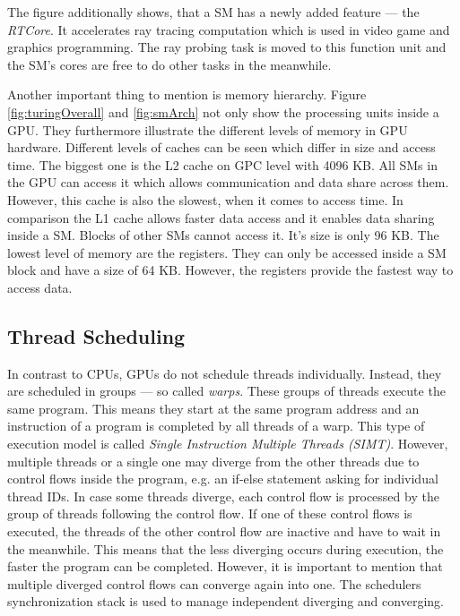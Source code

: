   The figure additionally shows, that a SM has a newly added feature --- the \textit{RTCore}.
  It accelerates ray tracing computation which is used in video game and graphics programming.
  The ray probing task is moved to this function unit and the SM's cores are free to do other tasks in the meanwhile.
  
 Another important thing to mention is memory hierarchy.
 Figure \ref{fig:turingOverall} and \ref{fig:smArch} not only show the processing units inside a GPU.
 They furthermore illustrate the different levels of memory in GPU hardware.
 Different levels of caches can be seen which differ in size and access time.
 The biggest one is the L2 cache on GPC level with 4096 KB.
 All SMs in the GPU can access it which allows communication and data share across them.
 However, this cache is also the slowest, when it comes to access time.
 In comparison the L1 cache allows faster data access and it enables data sharing inside a SM.
 Blocks of other SMs cannot access it. 
 It's size is only 96 KB.
 The lowest level of memory are the registers.
 They can only be accessed inside a SM block and have a size of 64 KB.
 However, the registers provide the fastest way to access data.~\cite{Huang.2008}~\cite{NVIDIA.2019}
        


\subsection{Thread Scheduling}
\label{subsec:Thr}
  In contrast to CPUs, GPUs do not schedule threads individually.
  Instead, they are scheduled in groups --- so called \textit{warps}.
  These groups of threads execute the same program.
  This means they start at the same program address and an instruction of a program is completed by all threads of a warp.
  This type of execution model is called \textit{Single Instruction Multiple Threads (SIMT)}.
  However, multiple threads or a single one may diverge from the other threads due to control flows inside the program, e.g. an if-else statement asking for individual thread IDs.
  In case some threads diverge, each control flow is processed by the group of threads following the control flow.
  If one of these control flows is executed, the threads of the other control flow are inactive and have to wait in the meanwhile.
  This means that the less diverging occurs during execution, the faster the program can be completed.
  However, it is important to mention that multiple diverged control flows can converge again into one.
  The schedulers synchronization stack is used to manage independent diverging and converging.~\cite{Rauber.2012}~\cite{Lindholm.2008}

